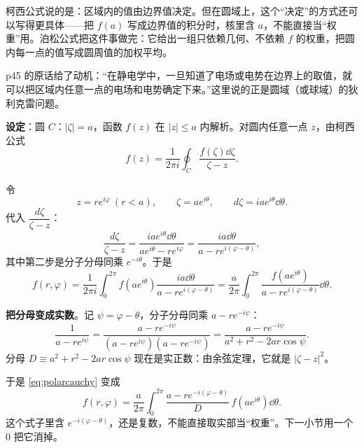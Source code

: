 
\flowerrule



柯西公式说的是：区域内的值由边界值决定。但在圆域上，这个“决定”的方式还可以写得更具体——把 $f(a)$ 写成边界值的积分时，核里含 $a$，不能直接当“权重”用。泊松公式把这件事做完：它给出一组只依赖几何、不依赖 $f$ 的权重，把圆内每一点的值写成圆周值的加权平均。

p45 的原话给了动机：“在静电学中，一旦知道了电场或电势在边界上的取值，就可以把区域内任意一点的电场和电势确定下来。”这里说的正是圆域（或球域）的狄利克雷问题。

\textbf{设定}：圆 $C$：$|\zeta|=a$，函数 $f(z)$ 在 $|z|\le a$ 内解析。对圆内任意一点 $z$，由柯西公式
\[ f(z)=\frac{1}{2\pi i}\oint_C\frac{f(\zeta)\dd\zeta}{\zeta-z} . \]


令
\[ z=re^{i\varphi}\ (r<a),\qquad \zeta=ae^{i\theta},\qquad d\zeta=iae^{i\theta}\dd\theta . \]
代入 $\dfrac{d\zeta}{\zeta-z}$：
\[ \frac{d\zeta}{\zeta-z}=\frac{iae^{i\theta}\dd\theta}{ae^{i\theta}-re^{i\varphi}}
=\frac{ia\dd\theta}{a-re^{i(\varphi-\theta)}} , \]
其中第二步是分子分母同乘 $e^{-i\theta}$。于是
\begin{equation}\label{eq:polarcauchy}
f(r,\varphi)=\frac{1}{2\pi i}\int_0^{2\pi}f(ae^{i\theta})\frac{ia\dd\theta}{a-re^{i(\varphi-\theta)}}
=\frac{a}{2\pi}\int_0^{2\pi}\frac{f(ae^{i\theta})}{a-re^{i(\varphi-\theta)}}\dd\theta .
\end{equation}


\textbf{把分母变成实数}。记 $\psi=\varphi-\theta$，分子分母同乘 $a-re^{-i\psi}$：
\begin{equation}\label{eq:rationalize}
\frac{1}{a-re^{i\psi}}=\frac{a-re^{-i\psi}}{(a-re^{i\psi})(a-re^{-i\psi})}
=\frac{a-re^{-i\psi}}{a^{2}+r^{2}-2ar\cos\psi} .
\end{equation}
分母 $D\equiv a^{2}+r^{2}-2ar\cos\psi$ 现在是实正数：由余弦定理，它就是 $|\zeta-z|^{2}$。

于是 \eqref{eq:polarcauchy} 变成
\begin{equation}\label{eq:step1}
f(r,\varphi)=\frac{a}{2\pi}\int_0^{2\pi}\frac{a-re^{-i(\varphi-\theta)}}{D}\,f(ae^{i\theta})\dd\theta .
\end{equation}
这个式子里含 $e^{-i(\varphi-\theta)}$，还是复数，不能直接取实部当“权重”。下一小节用一个 $0$ 把它消掉。

